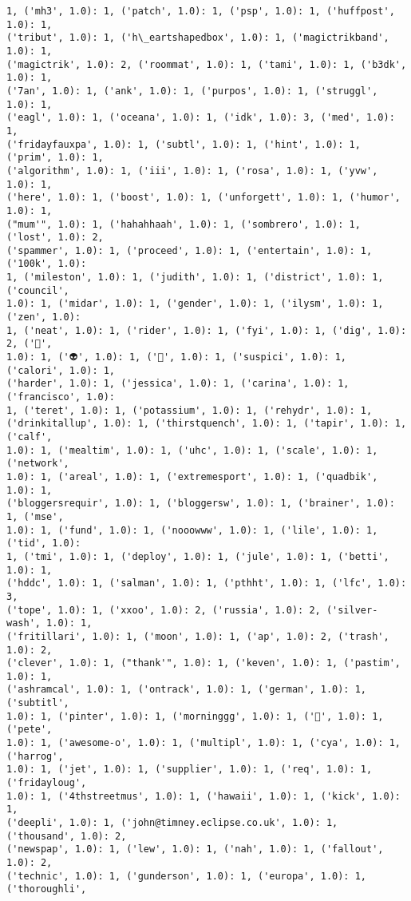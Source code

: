 \documentclass[11pt]{article}
\begin{document}
\begin{Verbatim}[commandchars=\\\{\}]
1, ('mh3', 1.0): 1, ('patch', 1.0): 1, ('psp', 1.0): 1, ('huffpost', 1.0): 1,
('tribut', 1.0): 1, ('h\_eartshapedbox', 1.0): 1, ('magictrikband', 1.0): 1,
('magictrik', 1.0): 2, ('roommat', 1.0): 1, ('tami', 1.0): 1, ('b3dk', 1.0): 1,
('7an', 1.0): 1, ('ank', 1.0): 1, ('purpos', 1.0): 1, ('struggl', 1.0): 1,
('eagl', 1.0): 1, ('oceana', 1.0): 1, ('idk', 1.0): 3, ('med', 1.0): 1,
('fridayfauxpa', 1.0): 1, ('subtl', 1.0): 1, ('hint', 1.0): 1, ('prim', 1.0): 1,
('algorithm', 1.0): 1, ('iii', 1.0): 1, ('rosa', 1.0): 1, ('yvw', 1.0): 1,
('here', 1.0): 1, ('boost', 1.0): 1, ('unforgett', 1.0): 1, ('humor', 1.0): 1,
("mum'", 1.0): 1, ('hahahhaah', 1.0): 1, ('sombrero', 1.0): 1, ('lost', 1.0): 2,
('spammer', 1.0): 1, ('proceed', 1.0): 1, ('entertain', 1.0): 1, ('100k', 1.0):
1, ('mileston', 1.0): 1, ('judith', 1.0): 1, ('district', 1.0): 1, ('council',
1.0): 1, ('midar', 1.0): 1, ('gender', 1.0): 1, ('ilysm', 1.0): 1, ('zen', 1.0):
1, ('neat', 1.0): 1, ('rider', 1.0): 1, ('fyi', 1.0): 1, ('dig', 1.0): 2, ('👱',
1.0): 1, ('👽', 1.0): 1, ('🌳', 1.0): 1, ('suspici', 1.0): 1, ('calori', 1.0): 1,
('harder', 1.0): 1, ('jessica', 1.0): 1, ('carina', 1.0): 1, ('francisco', 1.0):
1, ('teret', 1.0): 1, ('potassium', 1.0): 1, ('rehydr', 1.0): 1,
('drinkitallup', 1.0): 1, ('thirstquench', 1.0): 1, ('tapir', 1.0): 1, ('calf',
1.0): 1, ('mealtim', 1.0): 1, ('uhc', 1.0): 1, ('scale', 1.0): 1, ('network',
1.0): 1, ('areal', 1.0): 1, ('extremesport', 1.0): 1, ('quadbik', 1.0): 1,
('bloggersrequir', 1.0): 1, ('bloggersw', 1.0): 1, ('brainer', 1.0): 1, ('mse',
1.0): 1, ('fund', 1.0): 1, ('nooowww', 1.0): 1, ('lile', 1.0): 1, ('tid', 1.0):
1, ('tmi', 1.0): 1, ('deploy', 1.0): 1, ('jule', 1.0): 1, ('betti', 1.0): 1,
('hddc', 1.0): 1, ('salman', 1.0): 1, ('pthht', 1.0): 1, ('lfc', 1.0): 3,
('tope', 1.0): 1, ('xxoo', 1.0): 2, ('russia', 1.0): 2, ('silver-wash', 1.0): 1,
('fritillari', 1.0): 1, ('moon', 1.0): 1, ('ap', 1.0): 2, ('trash', 1.0): 2,
('clever', 1.0): 1, ("thank'", 1.0): 1, ('keven', 1.0): 1, ('pastim', 1.0): 1,
('ashramcal', 1.0): 1, ('ontrack', 1.0): 1, ('german', 1.0): 1, ('subtitl',
1.0): 1, ('pinter', 1.0): 1, ('morninggg', 1.0): 1, ('🐶', 1.0): 1, ('pete',
1.0): 1, ('awesome-o', 1.0): 1, ('multipl', 1.0): 1, ('cya', 1.0): 1, ('harrog',
1.0): 1, ('jet', 1.0): 1, ('supplier', 1.0): 1, ('req', 1.0): 1, ('fridayloug',
1.0): 1, ('4thstreetmus', 1.0): 1, ('hawaii', 1.0): 1, ('kick', 1.0): 1,
('deepli', 1.0): 1, ('john@timney.eclipse.co.uk', 1.0): 1, ('thousand', 1.0): 2,
('newspap', 1.0): 1, ('lew', 1.0): 1, ('nah', 1.0): 1, ('fallout', 1.0): 2,
('technic', 1.0): 1, ('gunderson', 1.0): 1, ('europa', 1.0): 1, ('thoroughli',

\end{Verbatim}
\end{document}
